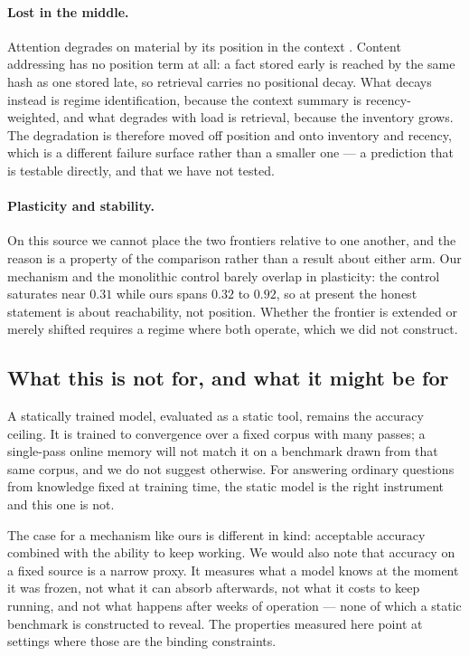 \documentclass[11pt,a4paper]{article}
\begin{document}
\paragraph{Lost in the middle.}
Attention degrades on material by its position in the context
\citep{liu2024lost}. Content addressing has no position term at all: a fact
stored early is reached by the same hash as one stored late, so retrieval
carries no positional decay. What decays instead is regime identification,
because the context summary is recency-weighted, and what degrades with load is
retrieval, because the inventory grows. The degradation is therefore moved off
position and onto inventory and recency, which is a different failure surface
rather than a smaller one --- a prediction that is testable directly, and that
we have not tested.

\paragraph{Plasticity and stability.}
On this source we cannot place the two frontiers relative to one another, and
the reason is a property of the comparison rather than a result about either
arm. Our mechanism and the monolithic control barely
overlap in plasticity: the control saturates near $0.31$ while ours spans
$0.32$ to $0.92$, so at present the honest statement is about reachability, not
position. Whether the frontier is extended or merely shifted requires a regime
where both operate, which we did not construct.

\subsection{What this is not for, and what it might be for}

A statically trained model, evaluated as a static tool, remains the accuracy
ceiling. It is trained to convergence over a fixed corpus with many passes; a
single-pass online memory will not match it on a benchmark drawn from that same
corpus, and we do not suggest otherwise. For answering ordinary questions from
knowledge fixed at training time, the static model is the right instrument and
this one is not.

The case for a mechanism like ours is different in kind: acceptable accuracy
combined with the ability to keep working. We would also note that accuracy on
a fixed source is a narrow proxy. It measures what a model knows at the moment
it was frozen, not what it can absorb afterwards, not what it costs to keep
running, and not what happens after weeks of operation --- none of which a
static benchmark is constructed to reveal. The properties measured here point
at settings where those are the binding constraints.
\end{document}
